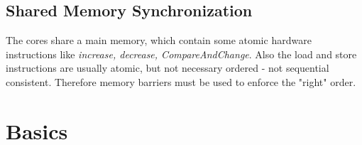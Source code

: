 \documentclass{article}
\begin{document}
\begin{adjustwidth}{2em}{2em}
		\subsection{Shared Memory Synchronization}
		\begin{adjustwidth}{1em}{}
			The cores share a main memory, which contain some atomic hardware instructions like \textit{increase, decrease, CompareAndChange}. Also the load and store instructions are usually atomic, but not necessary ordered - not sequential consistent. Therefore memory barriers must be used to enforce the "right" order.
		\end{adjustwidth}
	\end{adjustwidth}
	
	\section{Basics}
\end{document}
